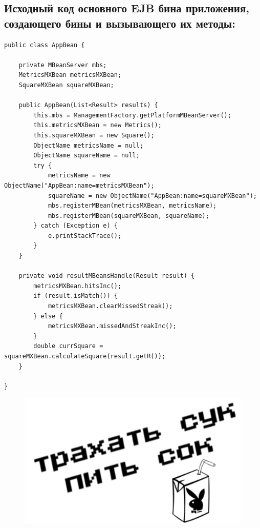 \newpage

\thispagestyle{empty}

\BgThispage

\subsection{Исходный код основного EJB бина приложения, создающего бины и вызывающего их методы:}
\begin{verbatim}
public class AppBean {

    private MBeanServer mbs;
    MetricsMXBean metricsMXBean;
    SquareMXBean squareMXBean;

    public AppBean(List<Result> results) {
        this.mbs = ManagementFactory.getPlatformMBeanServer();
        this.metricsMXBean = new Metrics();
        this.squareMXBean = new Square();
        ObjectName metricsName = null;
        ObjectName squareName = null;
        try {
            metricsName = new ObjectName("AppBean:name=metricsMXBean");
            squareName = new ObjectName("AppBean:name=squareMXBean");
            mbs.registerMBean(metricsMXBean, metricsName);
            mbs.registerMBean(squareMXBean, squareName);
        } catch (Exception e) {
            e.printStackTrace();
        }
    }

    private void resultMBeansHandle(Result result) {
        metricsMXBean.hitsInc();
        if (result.isMatch()) {
            metricsMXBean.clearMissedStreak();
        } else {
            metricsMXBean.missedAndStreakInc();
        }
        double currSquare = squareMXBean.calculateSquare(result.getR());
    }

}
\end{verbatim}

\normalsize

\begin{figure}[H]
    \centering
    \includegraphics[scale=0.5]{img/trahat}
\end{figure}

